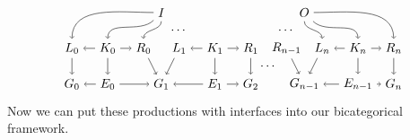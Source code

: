 \documentclass{tac}
\begin{document}
	\begin{equation} \label{diag.DerivationChain}
		\begin{tikzpicture}
		\node (G0) at (0,-1) {$G_0$};
		\node (E0) at (1,-1) {$E_0$};
		\node (G1) at (2.5,-1) {$G_1$};
		\node (E1) at (4,-1) {$E_1$};
		\node (G2) at (5,-1) {$G_2$};
		\node (Gn-1) at (6.5,-1) {$G_{n-1}$};
		\node (En-1) at (8,-1) {$E_{n-1}$};
		\node (Gn) at (9,-1) {$G_n$};
		\node (L0) at (0,0) {$L_0$};
		\node (K0) at (1,0) {$K_0$};
		\node (R0) at (2,0) {$R_0$};
		\node (L1) at (3,0) {$L_1$};
		\node (K1) at (4,0) {$K_1$};
		\node (R1) at (5,0) {$R_1$};
		\node (Rn-1) at (6,0) {$R_{n-1}$};
		\node (Ln) at (7,0) {$L_n$};
		\node (Kn) at (8,0) {$K_n$};
		\node (Rn) at (9,0) {$R_n$};
		\node (I) at (2.5,1) {$I$};
		\node (O) at (6.5,1) {$O$};
		\node (dots) at (5.5,-0.5) {$\dotsm$};
		\draw [->] (L0) edge (G0);
		\draw [->] (K0) edge (E0);
		\draw [->] (R0) edge (G1);
		\draw [->] (L1) edge (G1);
		\draw [->] (K1) edge (E1);
		\draw [->] (R1) edge (G2);
		\draw [->] (Rn-1) edge (Gn-1);
		\draw [->] (Ln) edge (Gn-1);
		\draw [->] (Kn) edge (En-1);
		\draw [->] (Rn) edge (Gn);
		\draw [->] (K0) edge (L0);
		\draw [->] (K0) edge (R0);
		\draw [->] (K1) edge (L1);
		\draw [->] (K1) edge (R1);
		\draw [->] (Kn) edge (Ln);
		\draw [->] (Kn) edge (Rn);
		\draw [->] (E0) edge (G0);
		\draw [->] (E0) edge (G1);
		\draw [->] (E1) edge (G1);
		\draw [->] (E1) edge (G2);
		\draw [->] (En-1) edge (Gn-1);
		\draw [->] (En-1) edge (Gn);
		\draw [->] (I) edge[out=180,in=90] (L0);
		\draw [->] (I) edge[out=225,in=90] (K0);
		\draw [->] (I) edge[out=270,in=90] (R0);
		\draw [->] (O) edge [out=0,in=90] (Rn);
		\draw [->] (O) edge [out=-45,in=90] (Kn);
		\draw [->] (O) edge [out=-90,in=90] (Ln);
		\node (Idots) at (3,0.5) {$\dotsm$};
		\node (Odots) at (6,0.5) {$\dotsm$};
		\end{tikzpicture}
	\end{equation}
Now we can put these productions with 
interfaces into our bicategorical framework.
\end{document}
